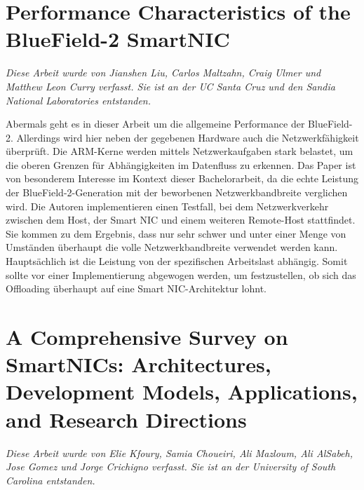 \section{Performance Characteristics of the BlueField-2 SmartNIC}
\textit{Diese Arbeit wurde von Jianshen Liu, Carlos Maltzahn, Craig Ulmer und Matthew Leon Curry verfasst. Sie ist an der UC Santa Cruz und den Sandia National Laboratories entstanden.}

Abermals geht es in dieser Arbeit um die allgemeine Performance der BlueField-2. Allerdings wird hier neben der gegebenen Hardware auch die Netzwerkfähigkeit überprüft. Die ARM-Kerne werden mittels Netzwerkaufgaben stark belastet, um die oberen Grenzen für Abhängigkeiten im Datenfluss zu erkennen. Das Paper ist von besonderem Interesse im Kontext dieser Bachelorarbeit, da die echte Leistung der BlueField-2-Generation mit der beworbenen Netzwerkbandbreite verglichen wird. Die Autoren implementieren einen Testfall, bei dem Netzwerkverkehr zwischen dem Host, der Smart NIC und einem weiteren Remote-Host stattfindet. Sie kommen zu dem Ergebnis, dass nur sehr schwer und unter einer Menge von Umständen überhaupt die volle Netzwerkbandbreite verwendet werden kann. Hauptsächlich ist die Leistung von der spezifischen Arbeitslast abhängig. Somit sollte vor einer Implementierung abgewogen werden, um festzustellen, ob sich das Offloading überhaupt auf eine Smart NIC-Architektur lohnt.
\section{A Comprehensive Survey on SmartNICs: Architectures, Development Models, Applications, and Research Directions}
\textit{Diese Arbeit wurde von Elie Kfoury, Samia Choueiri, Ali Mazloum, Ali AlSabeh, Jose Gomez und Jorge Crichigno verfasst. Sie ist an der University of South Carolina entstanden.}

